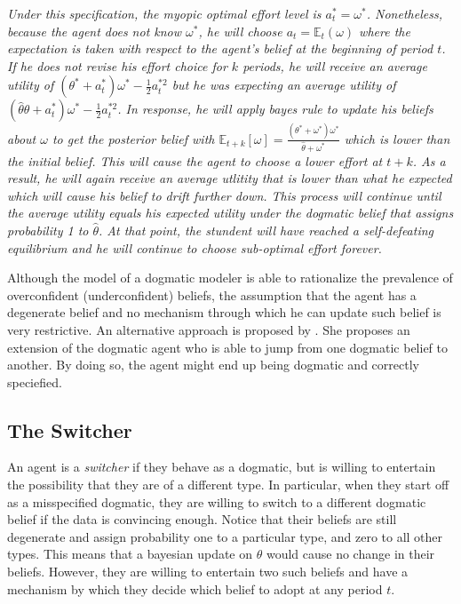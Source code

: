 \documentclass[
  12pt,
]{article}
\begin{document}
\emph{Under this specification, the myopic optimal effort level is
\(a_t^* = \omega^*\). Nonetheless, because the agent does not know
\(\omega^*\), he will choose \(a_t = \mathbb{E}_t(\omega)\) where the
expectation is taken with respect to the agent's belief at the beginning
of period \(t\). If he does not revise his effort choice for \(k\)
periods, he will receive an average utility of
\((\theta^*+a_t^*)\omega^* - \frac{1}{2}a_t^{*2}\) but he was expecting
an average utility of
\((\hat{\theta}\theta+a_t^*)\omega^* - \frac{1}{2}a_t^{*2}\). In
response, he will apply bayes rule to update his beliefs about
\(\omega\) to get the posterior belief with
\(\mathbb{E}_{t+k}[\omega] = \frac{(\theta^{*} + \omega^{*})\omega^{*}}{\hat{\theta} + \omega^{*}}\)
which is lower than the initial belief. This will cause the agent to
choose a lower effort at \(t+k\). As a result, he will again receive an
average utlitity that is lower than what he expected which will cause
his belief to drift further down. This process will continue until the
average utility equals his expected utility under the dogmatic belief
that assigns probability 1 to \(\hat{\theta}\). At that point, the
stundent will have reached a self-defeating equilibrium and he will
continue to choose sub-optimal effort forever. }

Although the model of a dogmatic modeler is able to rationalize the
prevalence of overconfident (underconfident) beliefs, the assumption
that the agent has a degenerate belief and no mechanism through which he
can update such belief is very restrictive. An alternative approach is
proposed by \citet{Ba2023}. She proposes an extension of the dogmatic
agent who is able to jump from one dogmatic belief to another. By doing
so, the agent might end up being dogmatic and correctly speciefied.

\hypertarget{the-switcher}{%
\subsection{The Switcher}\label{the-switcher}}

An agent is a \emph{switcher} if they behave as a dogmatic, but is
willing to entertain the possibility that they are of a different type.
In particular, when they start off as a misspecified dogmatic, they are
willing to switch to a different dogmatic belief if the data is
convincing enough. Notice that their beliefs are still degenerate and
assign probability one to a particular type, and zero to all other
types. This means that a bayesian update on \(\theta\) would cause no
change in their beliefs. However, they are willing to entertain two such
beliefs and have a mechanism by which they decide which belief to adopt
at any period \(t\).
\end{document}
